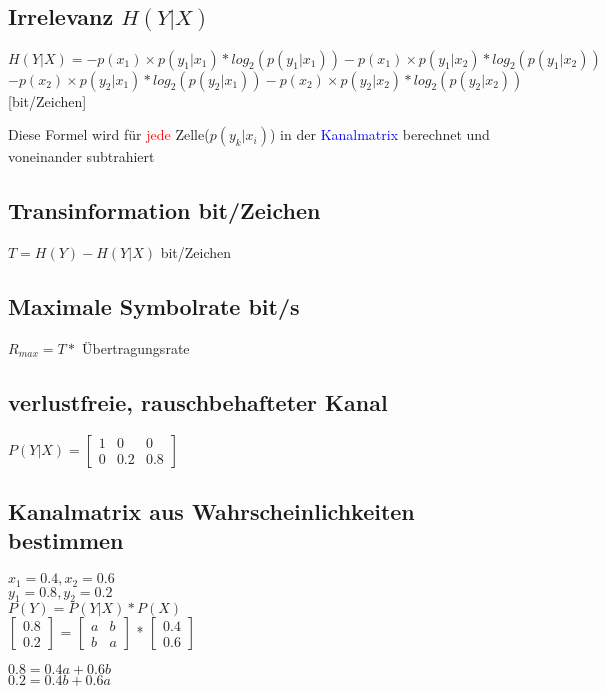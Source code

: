 \subsection{Irrelevanz $H(Y|X)$}


\colorbox{lightlightgrey}{$H(Y|X) = -p(x_1) \times p(y_1|x_1) * log_2(p(y_1|x_1)) - p(x_1) \times p(y_1|x_2) * log_2(p(y_1|x_2))$}
\colorbox{lightlightgrey}{$ - p(x_2) \times p(y_2|x_1) * log_2(p(y_2|x_1)) - p(x_2) \times p(y_2|x_2) * log_2(p(y_2|x_2))$ [bit/Zeichen]}

Diese Formel wird für \textcolor{red}{jede} Zelle($p(y_k|x_i)$) in der \textcolor{blue}{Kanalmatrix} berechnet und voneinander subtrahiert
\subsection{Transinformation bit/Zeichen}
\colorbox{lightlightgrey}{$T = H(Y) - H(Y|X)$ bit/Zeichen}



\subsection{Maximale Symbolrate bit/s}
$R_{max} = T *$ Übertragungsrate
\subsection{verlustfreie, rauschbehafteter Kanal}
$P(Y|X) = \begin{bmatrix}
              1 & 0 & 0\\
              0 & 0.2 & 0.8
\end{bmatrix}$



\subsection{Kanalmatrix aus Wahrscheinlichkeiten bestimmen}
\begin{minipage}[t]{0.15\textwidth}
    $x_1 = 0.4, x_2 = 0.6$\\
    $y_1 = 0.8, y_2 = 0.2$\\
    \colorbox{lightlightgrey}{$P(Y) = P(Y|X) * P(X)$}\\
    \colorbox{lightlightgrey}{$\begin{bmatrix}
                                   0.8\\
                                   0.2
    \end{bmatrix}$ =
    $\begin{bmatrix}
         a & b\\
         b & a
    \end{bmatrix}$ *
    $\begin{bmatrix}
         0.4\\
         0.6
    \end{bmatrix}$}
\end{minipage}
\hfill
\begin{minipage}[t]{0.15\textwidth}
    $0.8 = 0.4a + 0.6b$\\
    $0.2 = 0.4b + 0.6a$\\
\end{minipage}

\vfill
$$
\columnbreak






